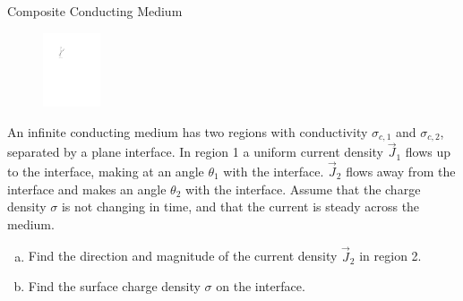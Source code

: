 \documentclass{esg8022pset}
\begin{document}
\begin{problem}{Composite Conducting Medium}
  \begin{figure}\vspace{-5\intextsep}
    \begin{center}\includegraphics[width=0.15\textwidth]{ps06_07_01}\end{center}
  \end{figure}
  An infinite conducting medium has two regions with conductivity $\sigma_{c,1}$ and $\sigma_{c,2}$, separated by a plane interface. In
  region 1 a uniform current density $\vec J_1$ flows up to the interface, making at an angle $\theta_1$ with the interface. $\vec J_2$ flows away from the interface and makes an angle $\theta_2$ with the interface. Assume that the charge density $\sigma$ is not changing in time, and that the current is steady across the medium.
  \begin{enumerate}[(a)]
    \item Find the direction and magnitude of the current density $\vec J_2$ in region 2.
    \item Find the surface charge density $\sigma$ on the interface.
  \end{enumerate}
\end{problem}
\end{document}
